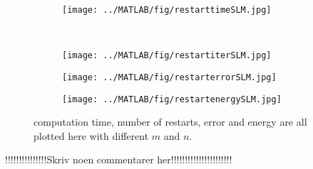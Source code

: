 \begin{figure}[H]
        \centering
        \begin{subfigure}[b]{0.45\textwidth}
                \texttt{[image: ../MATLAB/fig/restarttimeSLM.jpg]}
                \caption{  }
                \label{fig:restarttimeSLM}
        \end{subfigure}
        ~
        \begin{subfigure}[b]{0.45\textwidth}
                \texttt{[image: ../MATLAB/fig/restartiterSLM.jpg]}
                \caption{  }
                \label{fig:restartiterSLM}
        \end{subfigure}
        \begin{subfigure}[b]{0.45\textwidth}
                \texttt{[image: ../MATLAB/fig/restarterrorSLM.jpg]}
                \caption{  }
                \label{fig:restarterrorSLM}
        \end{subfigure}
        \begin{subfigure}[b]{0.45\textwidth}
                \texttt{[image: ../MATLAB/fig/restartenergySLM.jpg]}
                \caption{  }
                \label{fig:restartenergySLM}
        \end{subfigure}
        \caption{ computation time, number of restarts, error and energy are all plotted here with different $m$ and $n$. }
        \label{fig:restartSLM}
\end{figure}
!!!!!!!!!!!!!!!Skriv noen commentarer her!!!!!!!!!!!!!!!!!!!!!!\\
